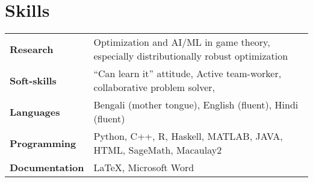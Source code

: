 \section{Skills}

\begin{tabular*}{\textwidth}{l @{\hskip 0.5in} l}
\textbf{Research} & Optimization and AI/ML in game theory, especially distributionally robust optimization\\
\textbf{Soft-skills} & ``Can learn it'' attitude, Active team-worker, collaborative problem solver, \\
\textbf{Languages} & Bengali (mother tongue), English (fluent), Hindi (fluent)\\
\textbf{Programming}  & {Python, C++, R, Haskell,  MATLAB, JAVA, HTML, SageMath, Macaulay2} \\
\textbf {Documentation} & {\LaTeX, Microsoft Word} \\
\end{tabular*}









